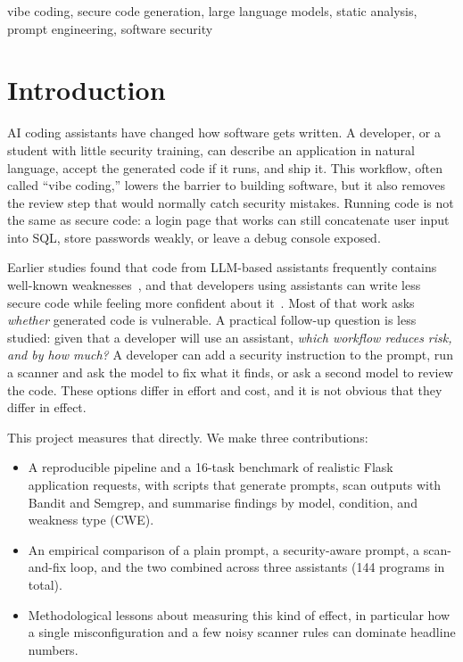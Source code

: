 \documentclass[conference]{IEEEtran}
\begin{document}
\begin{IEEEkeywords}
vibe coding, secure code generation, large language models, static analysis, prompt engineering, software security
\end{IEEEkeywords}

\section{Introduction}
AI coding assistants have changed how software gets written. A developer, or a student with little security training, can describe an application in natural language, accept the generated code if it runs, and ship it. This workflow, often called ``vibe coding,'' lowers the barrier to building software, but it also removes the review step that would normally catch security mistakes. Running code is not the same as secure code: a login page that works can still concatenate user input into SQL, store passwords weakly, or leave a debug console exposed.

Earlier studies found that code from LLM-based assistants frequently contains well-known weaknesses~\cite{pearce2022asleep,khoury2023secure,fu2023security}, and that developers using assistants can write less secure code while feeling more confident about it~\cite{perry2023users}. Most of that work asks \emph{whether} generated code is vulnerable. A practical follow-up question is less studied: given that a developer will use an assistant, \emph{which workflow reduces risk, and by how much?} A developer can add a security instruction to the prompt, run a scanner and ask the model to fix what it finds, or ask a second model to review the code. These options differ in effort and cost, and it is not obvious that they differ in effect.

This project measures that directly. We make three contributions:
\begin{itemize}
\item A reproducible pipeline and a 16-task benchmark of realistic Flask application requests, with scripts that generate prompts, scan outputs with Bandit and Semgrep, and summarise findings by model, condition, and weakness type (CWE).
\item An empirical comparison of a plain prompt, a security-aware prompt, a scan-and-fix loop, and the two combined across three assistants (144 programs in total).
\item Methodological lessons about measuring this kind of effect, in particular how a single misconfiguration and a few noisy scanner rules can dominate headline numbers.
\end{itemize}
\end{document}
